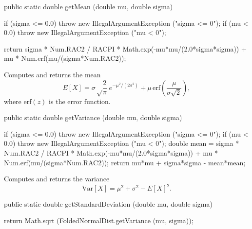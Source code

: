\begin{code}

   public static double getMean (double mu, double sigma)\begin{hide} {
      if (sigma <= 0.0)
         throw new IllegalArgumentException ("sigma <= 0");
      if (mu < 0.0)
         throw new IllegalArgumentException ("mu < 0");

      return sigma * Num.RAC2 / RACPI * Math.exp(-mu*mu/(2.0*sigma*sigma))
             + mu * Num.erf(mu/(sigma*Num.RAC2));
   }\end{hide}
\end{code}
\begin{tabb}  Computes and returns the mean
$$
E[X] =  \sigma \sqrt\frac2\pi\; e^{-\mu^2/(2\sigma^2)} 
             + \mu\,\mbox{erf}\left(\frac\mu{\sigma\sqrt 2}\right),
$$
where erf$(z)$ is the error function.
\end{tabb}
\begin{htmlonly}
\end{htmlonly}
\begin{code}

   public static double getVariance (double mu, double sigma)\begin{hide} {
      if (sigma <= 0.0)
         throw new IllegalArgumentException ("sigma <= 0");
      if (mu < 0.0)
         throw new IllegalArgumentException ("mu < 0");
      double mean = sigma * Num.RAC2 / RACPI * Math.exp(-mu*mu/(2.0*sigma*sigma))
                    + mu * Num.erf(mu/(sigma*Num.RAC2));
      return mu*mu + sigma*sigma - mean*mean;
   }\end{hide}
\end{code}
\begin{tabb}  Computes and returns the variance
 $$
\mbox{Var}[X] = \mu^2 + \sigma^2 - E[X]^2.
$$
\end{tabb}
\begin{htmlonly}
\end{htmlonly}
\begin{code}

   public static double getStandardDeviation (double mu, double sigma) \begin{hide} {
      return Math.sqrt (FoldedNormalDist.getVariance (mu, sigma));
   }\end{hide}
\end{code}
